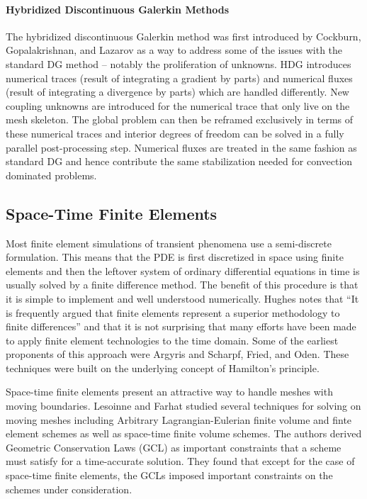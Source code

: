 \documentclass[Proposal.tex]{subfiles}
\begin{document}
\paragraph*{Hybridized Discontinuous Galerkin Methods}
The hybridized discontinuous Galerkin method was first introduced by Cockburn, Gopalakrishnan, and Lazarov\cite{HDG}
as a way to address some of the issues with the standard DG method 
-- notably the proliferation of unknowns.
HDG introduces numerical traces (result of integrating a gradient by parts) and numerical fluxes (result of integrating a divergence by parts) 
which are handled differently. 
New coupling unknowns are introduced for the numerical trace that only live on the mesh skeleton.
The global problem can then be reframed exclusively in terms of these numerical traces and interior degrees of freedom
can be solved in a fully parallel post-processing step.
Numerical fluxes are treated in the same fashion as standard DG and hence contribute the same stabilization needed for convection dominated problems.

\subsection{Space-Time Finite Elements}
Most finite element simulations of transient phenomena use a semi-discrete formulation.
This means that the PDE is first discretized in space using finite elements and then the leftover system of ordinary differential equations in time
is usually solved by a finite difference method.
The benefit of this procedure is that it is simple to implement and well understood numerically.
Hughes\cite{HughesSpaceTimeElastoDynamics} notes that 
``It is frequently argued that finite elements represent a superior methodology to finite differences'' 
and that it is not surprising that many efforts have been made to apply finite element technologies to the time domain.
Some of the earliest proponents of this approach were Argyris and Scharpf\cite{ArgyrisSpaceTime}, Fried\cite{FriedSpaceTime}, and Oden\cite{OdenSpaceTime}.
These techniques were built on the underlying concept of Hamilton's principle.

Space-time finite elements present an attractive way to handle meshes with moving boundaries.
Lesoinne and Farhat\cite{GCL} studied several techniques for solving on moving meshes including Arbitrary Lagrangian-Eulerian
finite volume and finte element schemes as well as space-time finite volume schemes. 
The authors derived Geometric Conservation Laws (GCL) as important constraints that a scheme must satisfy for a time-accurate solution.
They found that except for the case of space-time finite elements, the GCLs imposed important constraints on the schemes under consideration.
\end{document}

